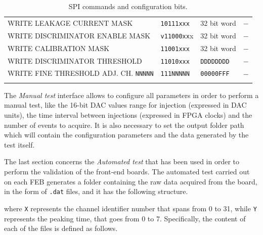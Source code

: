 \begin{table}[h!]
{\begin{tabular}{l l l l}
            WRITE LEAKAGE CURRENT MASK & \texttt{10111xxx} & 32 bit word & $\minus$ \T\B \\
            WRITE DISCRIMINATOR ENABLE MASK & \texttt{v11000xx}x & 32 bit word & $\minus$ \T\B \\
            WRITE CALIBRATION MASK & \texttt{11001xxx} & 32 bit word & $\minus$ \T\B \\
            WRITE DISCRIMINATOR THRESHOLD & \texttt{11010xxx} & \texttt{DDDDDDDD} & $\minus$ \T\B \\
            WRITE FINE THRESHOLD ADJ. CH. \texttt{NNNNN} & \texttt{111NNNNN} & \texttt{00000FFF} & $\minus$ \T\B \\
            \Xhline{2\arrayrulewidth}
        \end{tabular}
    }
    \caption{SPI commands and configuration bits.}
    \label{tabSPIcommand}
\end{table}

\par
The \textit{Manual test} interface allows to configure all parameters in order to perform a manual test, like the 16-bit DAC values range for injection (expressed in DAC units), the time interval between injections (expressed in FPGA clocks) and the number of events to acquire. It is also necessary to set the output folder path which will contain the configuration parameters and the data generated by the test itself.

\par
The last section concerns the \textit{Automated test} that has been used in order to perform the validation of the front-end boards. The automated test carried out on each FEB generates a folder containing the raw data acquired from the board, in the form of \texttt{.dat} files, and it has the following structure.\\


\vspace{0.5cm}
\noindent
where \texttt{X} represents the channel identifier number that spans from 0 to 31, while \texttt{Y} represents the peaking time, that goes from 0 to 7. Specifically, the content of each of the files is defined as follows.

